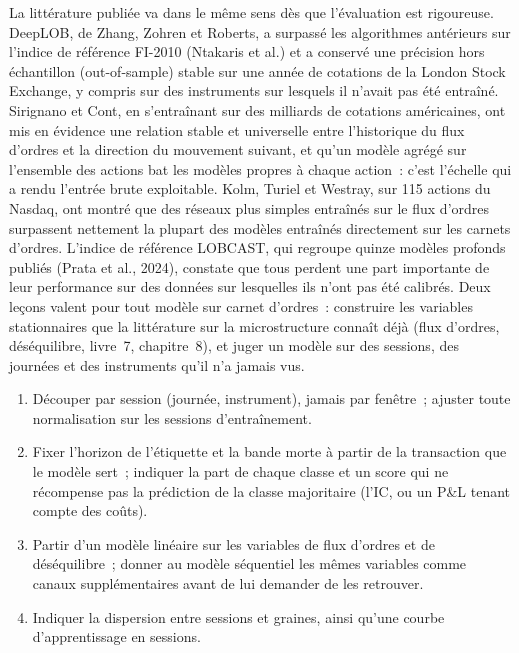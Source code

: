 La littérature publiée va dans le même sens dès que l'évaluation est rigoureuse. DeepLOB, de Zhang, Zohren et Roberts, a surpassé
les algorithmes antérieurs sur l'indice de référence FI-2010 (Ntakaris et al.) et a conservé une précision hors échantillon (out-of-sample) stable sur une année de
cotations de la London Stock Exchange, y compris sur des instruments sur lesquels il n'avait pas été entraîné. Sirignano et Cont, en s'entraînant sur
des milliards de cotations américaines, ont mis en évidence une relation stable et universelle entre l'historique du flux d'ordres et la direction du
mouvement suivant, et qu'un modèle agrégé sur l'ensemble des actions bat les modèles propres à chaque action~: c'est l'échelle qui a rendu l'entrée brute exploitable. Kolm,
Turiel et Westray, sur 115 actions du Nasdaq, ont montré que des réseaux plus simples entraînés sur le flux d'ordres surpassent nettement
la plupart des modèles entraînés directement sur les carnets d'ordres. L'indice de référence LOBCAST, qui regroupe quinze modèles profonds publiés (Prata et al., 2024),
constate que tous perdent une part importante de leur performance sur des données sur lesquelles ils n'ont pas été calibrés. Deux leçons valent pour tout
modèle sur carnet d'ordres~: construire les variables stationnaires que la littérature sur la microstructure connaît déjà (flux d'ordres, déséquilibre,
livre~7, chapitre~8), et juger un modèle sur des sessions, des journées et des instruments qu'il n'a jamais vus.

\begin{method}\label{met:ml:lobseq:method}
\begin{enumerate}
\item Découper par session (journée, instrument), jamais par fenêtre~; ajuster toute normalisation sur les sessions d'entraînement.
\item Fixer l'horizon de l'étiquette et la bande morte à partir de la transaction que le modèle sert~; indiquer la part de chaque classe et un score qui
ne récompense pas la prédiction de la classe majoritaire (l'IC, ou un P\&L tenant compte des coûts).
\item Partir d'un modèle linéaire sur les variables de flux d'ordres et de déséquilibre~; donner au modèle séquentiel les mêmes variables comme
canaux supplémentaires avant de lui demander de les retrouver.
\item Indiquer la dispersion entre sessions et graines, ainsi qu'une courbe d'apprentissage en sessions.
\end{enumerate}
\end{method}

